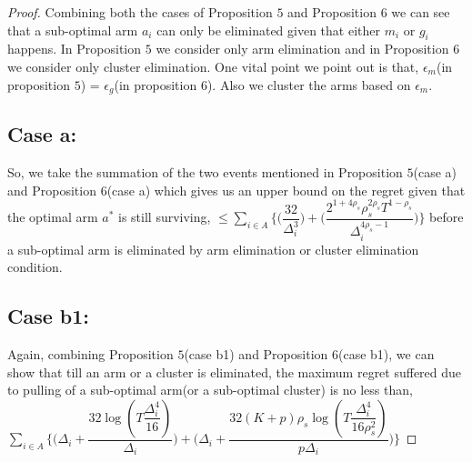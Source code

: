 \begin{proof}
Combining both the cases of Proposition $5$ and Proposition $6$ we can see that a sub-optimal arm $a_{i}$ can only be eliminated given that either $m_{i}$ or $g_{i}$ happens. In Proposition $5$ we consider only arm elimination and in Proposition $6$ we consider only cluster elimination. One vital point we point out is that, $\epsilon_{m}$(in proposition $5$) = $\epsilon_{g}$(in proposition $6$). Also we cluster the arms based on $\epsilon_{m}$.
\subsection{Case a:} 
So, we take the summation of the two events mentioned in Proposition $5$(case a) and Proposition $6$(case a)
which gives us an upper bound on the regret given that the optimal arm $a^{*}$ is still surviving, 
\newline
$\leq \sum_{i\in A}\bigg\lbrace\bigg(\dfrac{32}{\Delta_{i}^{3}}\bigg) + \bigg(\dfrac{2^{1+4\rho_{s}}\rho_{s}^{2\rho_{s}}T^{1-\rho_{s}}}{\Delta_{i}^{4\rho_{s}-1}}\bigg)\bigg\rbrace$ 
\newline
before a sub-optimal arm is eliminated by arm elimination or cluster elimination condition.
\subsection{Case b1:} 
Again, combining Proposition $5$(case b1) and Proposition $6$(case b1), we can show that till an arm or a cluster is eliminated, the maximum regret suffered due to pulling of a sub-optimal arm(or a sub-optimal cluster) is no less than,
\newline
$\sum_{i\in A}\bigg\lbrace\bigg(\Delta_{i}+\dfrac{32\log{(T\dfrac{\Delta_{i}^{4}}{16})}}{\Delta_{i}}\bigg) + \bigg(\Delta_{i}+\dfrac{32(K+p)\rho_{s}\log{(T\dfrac{\Delta_{i}^{4}}{16\rho_{s}^{2}})}}{p\Delta_{i}}\bigg)\bigg\rbrace $
\newline

\end{proof}
